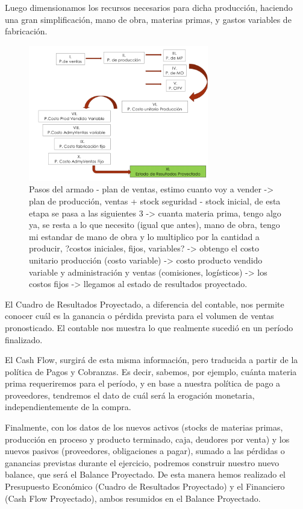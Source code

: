 \documentclass[titlepage,a4paper]{article}
\begin{document}
Luego dimensionamos los recursos necesarios para dicha producción, haciendo una gran simplificación, mano de obra, materias primas, y gastos variables de fabricación.

\begin{figure}[!htb]
    \centering
    \includegraphics[width=0.7\textwidth]{imagenes/presupuesto pasos.PNG}
    \caption{Pasos del armado - plan de ventas, estimo cuanto voy a vender -> plan de producción, ventas + stock seguridad - stock inicial, de esta etapa se pasa a las siguientes 3 -> cuanta materia prima, tengo algo ya, se resta a lo que necesito (igual que antes), mano de obra, tengo mi estandar de mano de obra y lo multiplico por la cantidad a producir, ?costos iniciales, fijos, variables? -> obtengo el costo unitario producción (costo variable) -> costo producto vendido variable y administración y ventas (comisiones, logísticos) -> los costos fijos -> llegamos al estado de resultados proyectado.}
\end{figure}

El Cuadro de Resultados Proyectado, a diferencia del contable, nos permite conocer cuál es la ganancia o 
pérdida prevista para el volumen de ventas pronosticado. El contable nos muestra lo que realmente sucedió 
en un período finalizado.

El Cash Flow, surgirá de esta misma información, pero traducida a partir de la política de Pagos y 
Cobranzas. Es decir, sabemos, por ejemplo, cuánta materia prima requeriremos para el período, y en base a
nuestra política de pago a proveedores, tendremos el dato de cuál será la erogación monetaria, 
independientemente de la compra.

Finalmente, con los datos de los nuevos activos (stocks de materias primas, producción en proceso y 
producto terminado, caja, deudores por venta) y los nuevos pasivos (proveedores, obligaciones a pagar), 
sumado a las pérdidas o ganancias previstas durante el ejercicio, podremos construir nuestro nuevo balance, 
que será el Balance Proyectado. De esta manera hemos realizado el Presupuesto Económico (Cuadro de 
Resultados Proyectado) y el Financiero (Cash Flow Proyectado), ambos resumidos en el Balance Proyectado.
\end{document}
